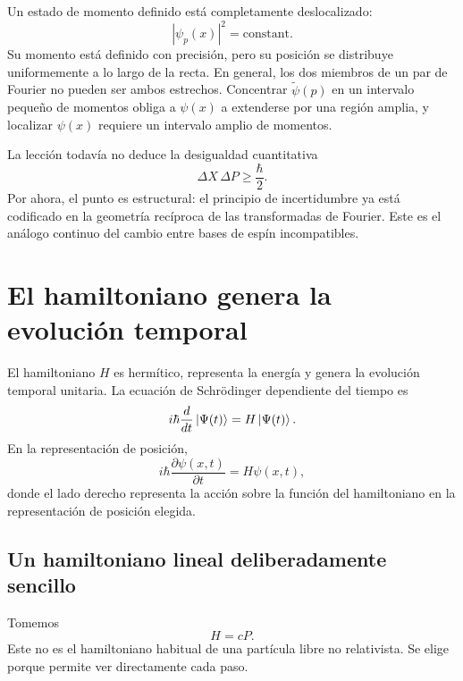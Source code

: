 Un estado de momento definido está completamente deslocalizado:
\begin{equation}
|\psi_p(x)|^2=\text{constant}.
\end{equation}
Su momento está definido con precisión, pero su posición se distribuye uniformemente a lo largo de la recta. En general, los dos miembros de un par de Fourier no pueden ser ambos estrechos. Concentrar \(\widetilde{\psi}(p)\) en un intervalo pequeño de momentos obliga a \(\psi(x)\) a extenderse por una región amplia, y localizar \(\psi(x)\) requiere un intervalo amplio de momentos.

La lección todavía no deduce la desigualdad cuantitativa
\begin{equation}
\Delta X\,\Delta P\geq\frac{\hbar}{2}.
\end{equation}
Por ahora, el punto es estructural: el principio de incertidumbre ya está codificado en la geometría recíproca de las transformadas de Fourier. Este es el análogo continuo del cambio entre bases de espín incompatibles.

\section{El hamiltoniano genera la evolución temporal}

El hamiltoniano \(H\) es hermítico, representa la energía y genera la evolución temporal unitaria. La ecuación de Schr\"odinger dependiente del tiempo es
\begin{equation}
i\hbar\frac{d}{dt}\left\lvert\Psi(t)\right\rangle
=
H\left\lvert\Psi(t)\right\rangle.
\label{eq:l9-abstract-schrodinger}
\end{equation}
En la representación de posición,
\begin{equation}
i\hbar\frac{\partial\psi(x,t)}{\partial t}
=
H\psi(x,t),
\label{eq:l9-position-schrodinger}
\end{equation}
donde el lado derecho representa la acción sobre la función del hamiltoniano en la representación de posición elegida.

\subsection{Un hamiltoniano lineal deliberadamente sencillo}

Tomemos
\begin{equation}
H=cP.
\label{eq:l9-linear-hamiltonian}
\end{equation}
Este no es el hamiltoniano habitual de una partícula libre no relativista. Se elige porque permite ver directamente cada paso.

